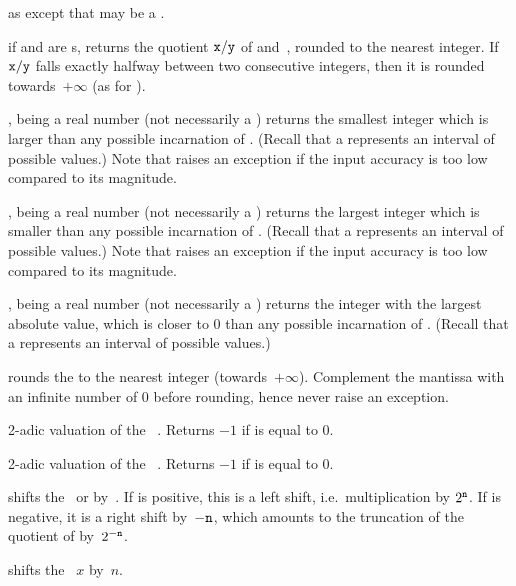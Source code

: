 as  except that  may be a .

 if  and  are s,
returns the quotient ${\tt x}/{\tt y}$ of  and~, rounded to
the nearest integer. If ${\tt x}/{\tt y}$ falls exactly halfway between
two consecutive integers, then it is rounded towards~$+\infty$ (as for
).

,  being a real number (not necessarily a
) returns the smallest integer which is larger than any possible
incarnation of . (Recall that a  represents an interval of
possible values.) Note that  raises an exception if the input accuracy
is too low compared to its magnitude.

,  being a real number (not necessarily a
) returns the largest integer which is smaller than any possible
incarnation of . (Recall that a  represents an interval of
possible values.) Note that  raises an exception if the input
accuracy is too low compared to its magnitude.

,  being a real number (not necessarily a
) returns the integer with the largest absolute value, which is closer
to $0$ than any possible incarnation of . (Recall that a 
represents an interval of possible values.)

 rounds the   to the nearest
integer (towards~$+\infty$). Complement the mantissa with an infinite number
of $0$ before rounding, hence never raise an exception.


 2-adic valuation of the ~. Returns
$-1$ if  is equal to 0.

 2-adic valuation of the ~. Returns $-1$
if  is equal to 0.

 shifts the~ or
  by~. If  is positive, this is a left shift,
i.e.~multiplication by $2^{{\tt n}}$. If  is negative, it is a right
shift by~$-{\tt n}$, which amounts to the truncation of the quotient of 
by~$2^{-{\tt n}}$.

 shifts the ~$x$ by~$n$.

